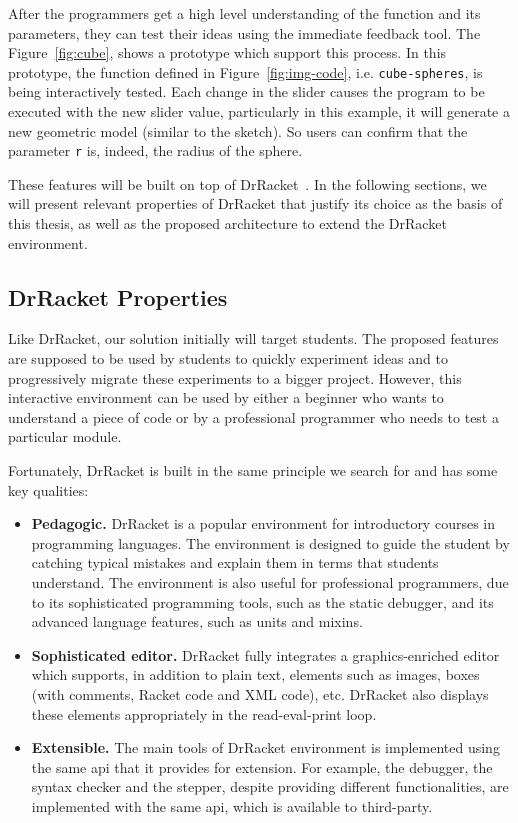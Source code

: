 After the programmers get a high level understanding of the function and its parameters, they can test their ideas using the immediate feedback tool. The Figure~\ref{fig:cube}, shows a prototype which support this process. In this prototype, the function defined in Figure~\ref{fig:img-code}, i.e. \texttt{cube-spheres}, is being interactively tested. Each change in the slider causes the program to be executed with the new slider value, particularly in this example, it will generate a new geometric model (similar to the sketch). So users can confirm that the parameter \texttt{r} is, indeed, the radius of the sphere.

These features will be built on top of DrRacket~\cite{findler2002drscheme}. In the following sections, we will present relevant properties of DrRacket that justify its choice as the basis of this thesis, as well as the proposed architecture to extend the DrRacket environment.

\subsection{DrRacket Properties}

Like DrRacket, our solution initially will target students. The proposed features are supposed to be used by students to quickly experiment ideas and to progressively migrate these experiments to a bigger project. However, this interactive environment can be used by either a beginner who wants to understand a piece of code or by a professional programmer who needs to test a particular module.

Fortunately, DrRacket is built in the same principle we search for and has some key qualities:

\begin{itemize}
	\item \textbf{Pedagogic.} DrRacket is a popular environment for introductory courses in programming languages. The environment is designed to guide the student by catching typical mistakes and explain them in terms that students understand. The environment is also useful for professional programmers, due to its sophisticated programming tools, such as the static debugger, and its advanced language features, such as units and mixins.

	\item \textbf{Sophisticated editor.} DrRacket fully integrates a graphics-enriched editor which supports, in addition to plain text, elements such as images, boxes (with comments, Racket code and XML code), etc. DrRacket also displays these elements appropriately in the read-eval-print loop.

	\item \textbf{Extensible.} The main tools of DrRacket environment is implemented using the same \ac{api} that it provides for extension. For example, the debugger, the syntax checker and the stepper, despite providing different functionalities, are implemented with the same \ac{api}, which is available to third-party.
\end{itemize}

